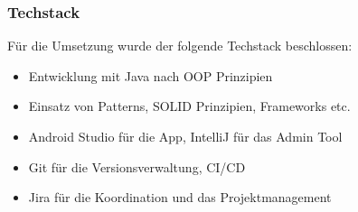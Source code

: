 \begin{frame}
\frametitle{Techstack}
	Für die Umsetzung wurde der folgende Techstack beschlossen:

	\begin{itemize}
		\item Entwicklung mit Java nach OOP Prinzipien
		\item Einsatz von Patterns, SOLID Prinzipien, Frameworks etc. 
		\item Android Studio für die App, IntelliJ für das Admin Tool
		\item Git für die Versionsverwaltung, CI/CD
		\item Jira für die Koordination und das Projektmanagement
	\end{itemize}
\end{frame}